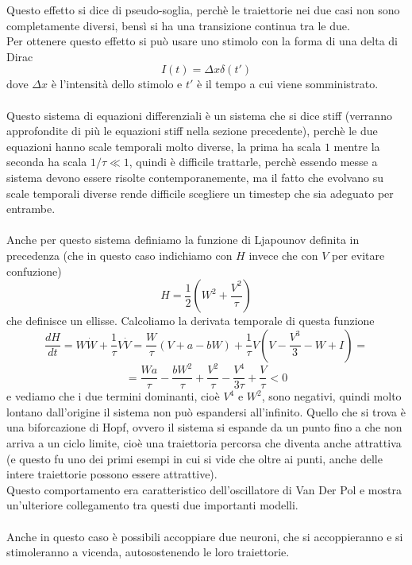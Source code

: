 \documentclass[12pt]{article}
\begin{document}
Questo effetto si dice di pseudo-soglia, perchè le traiettorie nei due casi non sono completamente diversi, bensì si ha una transizione continua tra le due. \\
Per ottenere questo effetto si può usare uno stimolo con la forma di una delta di Dirac
\begin{equation}
	I(t) = \Delta x\delta(t')
\end{equation}
dove $\Delta x$ è l'intensità dello stimolo e $t'$ è il tempo a cui viene somministrato. \\ \\
Questo sistema di equazioni differenziali è un sistema che si dice stiff (verranno approfondite di più le equazioni stiff nella sezione precedente), perchè le due equazioni hanno scale temporali molto diverse, la prima ha scala $1$ mentre la seconda ha scala $1/\tau \ll 1$, quindi è difficile trattarle, perchè essendo messe a sistema devono essere risolte contemporanemente, ma il fatto che evolvano su scale temporali diverse rende difficile scegliere un timestep che sia adeguato per entrambe.  \\ \\
Anche per questo sistema definiamo la funzione di Ljapounov definita in precedenza (che in questo caso indichiamo con $H$ invece che con $V$ per evitare confuzione)
\begin{equation}
	H = \frac{1}{2}\left(W^2 + \frac{V^2}{\tau} \right) 
\end{equation}
che definisce un ellisse. Calcoliamo la derivata temporale di questa funzione
$$
	\frac{dH}{dt} = W\dot{W} + \frac{1}{\tau}V\dot{V} = \frac{W}{\tau}\left(V+a-bW\right)+\frac{1}{\tau}V\left(V - \frac{V^3}{3}-W+I \right) = 
$$
$$
	=\frac{Wa}{\tau} - \frac{bW^2}{\tau} + \frac{V^2}{\tau} - \frac{V^4}{3\tau} + \frac{V}{\tau} < 0
$$
e vediamo che i due termini dominanti, cioè $V^4$ e $W^2$, sono negativi, quindi molto lontano dall'origine il sistema non può espandersi all'infinito. Quello che si trova è una biforcazione di Hopf, ovvero il sistema si espande da un punto fino a che non arriva a un ciclo limite, cioè una traiettoria percorsa che diventa anche attrattiva (e questo fu uno dei primi esempi in cui si vide che oltre ai punti, anche delle intere traiettorie possono essere attrattive). \\
Questo comportamento era caratteristico dell'oscillatore di Van Der Pol e mostra un'ulteriore collegamento tra questi due importanti modelli. \\ \\
Anche in questo caso è possibili accoppiare due neuroni, che si accoppieranno e si stimoleranno a vicenda, autosostenendo le loro traiettorie.
\end{document}
